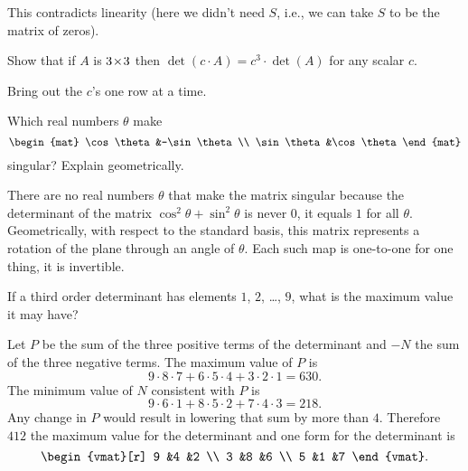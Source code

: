 \begin{exercises}
\begin{answer}
\begin{equation*}
      \end{equation*}
      This contradicts linearity (here we didn't need \( S \), i.e., we can 
      take $S$ to be the matrix of zeros).  
    \end{answer}
  \item 
    Show that if \( A \) is \( 3 \! \times \! 3 \) then
    \( \det(c\cdot A)=c^3\cdot \det(A) \) for any scalar \( c \).
    \begin{answer}
       Bring out the \( c \)'s one row at a time.  
    \end{answer}
  \item 
    Which real numbers \( \theta \) make
    \begin{equation*}
       \begin{mat}
          \cos\theta  &-\sin\theta  \\
          \sin\theta  &\cos\theta
       \end{mat}
    \end{equation*}
    singular?
    Explain geometrically.
    \begin{answer}
      There are no real numbers \( \theta \) that make the matrix singular 
      because the determinant of the matrix
      \( \cos^2\theta+\sin^2\theta \) is never $0$, it equals $1$
      for all $\theta$.
      Geometrically, with respect to the standard basis,
      this matrix represents
      a rotation of the plane through an angle of \( \theta \).
      Each such map is one-to-one \Dash  for one thing, it is invertible.  
    \end{answer}
  \puzzle \item  
    \cite{Monthly55p257}
    If a third order determinant has elements
    \( 1 \), \( 2 \), \ldots, \( 9 \), what is the maximum value it may
    have?
    \begin{answer}
      \answerasgiven
      Let \( P \) be the sum of the three positive terms of the determinant
      and \( -N \) the sum of the three negative terms.
      The maximum value of \( P \) is
      \begin{equation*}
        9\cdot 8\cdot 7 +6\cdot 5\cdot 4 +3\cdot 2\cdot 1=630.
      \end{equation*}
      The minimum value of \( N \) consistent with \( P \) is
      \begin{equation*}
        9\cdot 6\cdot 1 +8\cdot 5\cdot 2 +7\cdot 4\cdot 3=218.
      \end{equation*}
      Any change in \( P \) would result in lowering that sum by more than
      \( 4 \).
      Therefore \( 412 \) the maximum value for the determinant and one form
      for the determinant is
      \begin{equation*}
         \begin{vmat}[r]
            9  &4  &2  \\
            3  &8  &6  \\
            5  &1  &7
         \end{vmat}.
      \end{equation*}  
    \end{answer}
\end{exercises}
